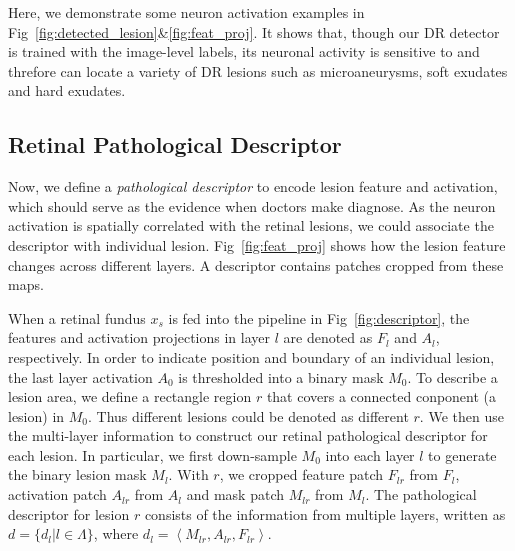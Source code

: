 \documentclass[letterpaper]{article} %
\begin{document}
    Here, we demonstrate some neuron activation examples in Fig~\ref{fig:detected_lesion}\&\ref{fig:feat_proj}. It shows that, though our DR detector is trained with the image-level labels,
    its neuronal activity is sensitive to and threfore can locate a variety of DR lesions such as microaneurysms, soft exudates and hard exudates.


	\subsection{Retinal Pathological Descriptor}

    Now, we define a \emph{pathological descriptor} to encode lesion feature and activation, which should serve as the evidence when doctors make diagnose. As the neuron activation is spatially correlated with the retinal lesions, we could associate the descriptor with individual lesion.  Fig~\ref{fig:feat_proj} shows how the lesion feature changes across different layers. A descriptor contains patches cropped from these maps.


	When a retinal fundus $ x_s $ is fed into the pipeline in Fig~\ref{fig:descriptor}, the features and activation projections in layer $ l $ are denoted as $ F_l $ and $ A_l $, respectively. In order to indicate position and boundary of an individual lesion, the last layer activation $ A_0 $ is thresholded into a binary mask $ M_0 $. To describe a lesion area, we define a rectangle region $r$ that covers a connected conponent (a lesion) in $ M_0 $. Thus different lesions could be denoted as different $r$. We then use the multi-layer information to construct our retinal pathological descriptor for each lesion. In particular, we first down-sample $M_0$ into each layer $l$ to generate the binary lesion mask $M_l$. With $r$, we cropped feature patch $F_{lr}$ from $F_l$, activation patch $A_{lr}$ from $A_l$ and mask patch $M_{lr}$ from $M_l$. The pathological descriptor for lesion $r$ consists of the information from multiple layers, written as $d = \{d_{l}|l\in \Lambda\}$, where $ d_{l} = \left<M_{lr}, A_{lr}, F_{lr}\right> $.
\end{document}
